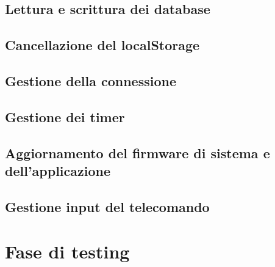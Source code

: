 \subsection{Lettura e scrittura dei database} \label{database}
\subsection{Cancellazione del localStorage} \label{freestorage}
\subsection{Gestione della connessione}
\subsection{Gestione dei timer}
\subsection{Aggiornamento del firmware di sistema e dell'applicazione}\label{update}
\subsection{Gestione input del telecomando}

\section{Fase di testing}


